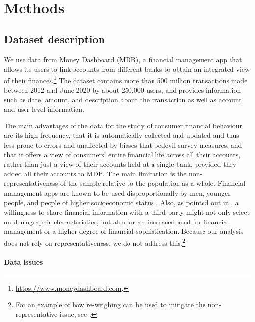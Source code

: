 
\section{Methods}%
\label{sec:methods}


\subsection{Dataset description}
\label{par:dataset_description}

We use data from Money Dashboard (MDB), a financial management app that allows
its users to link accounts from different banks to obtain an integrated view of
their
finances.\footnote{\href{https://www.moneydashboard.com}{https://www.moneydashboard.com}.}
The dataset contains more than 500 million transactions made between 2012 and
June 2020 by about 250,000 users, and provides information such as date,
amount, and description about the transaction as well as account and user-level
information.

The main advantages of the data for the study of consumer financial behaviour
are its high frequency, that it is automatically collected and updated and thus
less prone to errors and unaffected by biases that bedevil survey measures, and
that it offers a view of consumers' entire financial life across all their
accounts, rather than just a view of their accounts held at a single bank,
provided they added all their accounts to MDB. The main limitation is the
non-representativeness of the sample relative to the population as a whole.
Financial management apps are known to be used disproportionally by men,
younger people, and people of higher socioeconomic status
\citep{carlin2019generational}. Also, as pointed out in
\citet{gelman2014harnessing}, a willingness to share financial information with
a third party might not only select on demographic characteristics, but also
for an increased need for financial management or a higher degree of financial
sophistication. Because our analysis does not rely on representativeness, we do
not address this.\footnote{For an example of how re-weighing can be used to
mitigate the non-representative issue, see \citet{bourquin2020effects}.}


\paragraph{Data issues}%
\label{par:data_issues}

